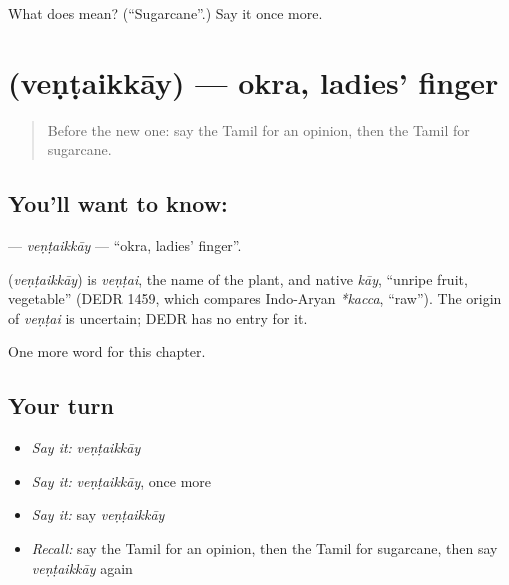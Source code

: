 \begin{tcolorbox}[breakable,colback=teal!4,colframe=teal!35!black,title={Before you move on}]
What does  mean? (\textquotedblleft{}Sugarcane\textquotedblright{}.) Say it once more.
\end{tcolorbox}
\section[\texorpdfstring{\ta{வெண்டைக்காய்} (veṇṭaikkāy)}{வெண்டைக்காய் (veṇṭaikkāy)}]{ (veṇṭaikkāy) — okra, ladies' finger}

\label{lesson:TA-C278-ventaikkay}



\begin{quote}
Before the new one: say the Tamil for an opinion, then the Tamil for sugarcane.
\end{quote}

\subsection*{You'll want to know: }
\textbf{} — \emph{veṇṭaikkāy} — \textquotedblleft{}okra, ladies' finger\textquotedblright{}.

\begin{cousinweb}
\textbf{} (\emph{veṇṭaikkāy}) is \emph{veṇṭai}, the name of the plant, and native \emph{kāy}, \textquotedblleft{}unripe fruit, vegetable\textquotedblright{} (DEDR 1459, which compares Indo-Aryan \emph{*kacca}, \textquotedblleft{}raw\textquotedblright{}). The origin of \emph{veṇṭai} is uncertain; DEDR has no entry for it.
\end{cousinweb}

\begin{grammarlens}[title={What you've built}]
One more word for this chapter.
\end{grammarlens}

\subsection*{Your turn}
\begin{itemize}
\raggedright
  \item \emph{Say it:} \emph{veṇṭaikkāy}
  \item \emph{Say it:} \emph{veṇṭaikkāy}, once more
  \item \emph{Say it:} say \emph{veṇṭaikkāy}
  \item \emph{Recall:} say the Tamil for an opinion, then the Tamil for sugarcane, then say \emph{veṇṭaikkāy} again
\end{itemize}

